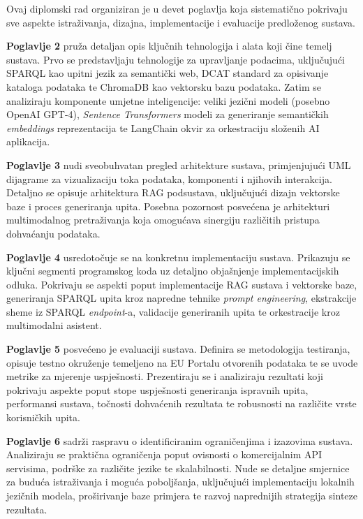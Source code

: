 Ovaj diplomski rad organiziran je u devet poglavlja koja sistematično pokrivaju sve aspekte istraživanja, dizajna, implementacije i evaluacije predloženog sustava.

\textbf{Poglavlje 2} pruža detaljan opis ključnih tehnologija i alata koji čine temelj sustava. Prvo se predstavljaju tehnologije za upravljanje podacima, uključujući SPARQL kao upitni jezik za semantički web, DCAT standard za opisivanje kataloga podataka te ChromaDB kao vektorsku bazu podataka. Zatim se analiziraju komponente umjetne inteligencije: veliki jezični modeli (posebno OpenAI GPT-4), \textit{Sentence Transformers} modeli za generiranje semantičkih \textit{embeddings} reprezentacija te LangChain okvir za orkestraciju složenih AI aplikacija.

\textbf{Poglavlje 3} nudi sveobuhvatan pregled arhitekture sustava, primjenjujući UML dijagrame za vizualizaciju toka podataka, komponenti i njihovih interakcija. Detaljno se opisuje arhitektura RAG podsustava, uključujući dizajn vektorske baze i proces generiranja upita. Posebna pozornost posvećena je arhitekturi multimodalnog pretraživanja koja omogućava sinergiju različitih pristupa dohvaćanju podataka.

\textbf{Poglavlje 4} usredotočuje se na konkretnu implementaciju sustava. Prikazuju se ključni segmenti programskog koda uz detaljno objašnjenje implementacijskih odluka. Pokrivaju se aspekti poput implementacije RAG sustava i vektorske baze, generiranja SPARQL upita kroz napredne tehnike \textit{prompt engineering}, ekstrakcije sheme iz SPARQL \textit{endpoint}-a, validacije generiranih upita te orkestracije kroz multimodalni asistent.

\textbf{Poglavlje 5} posvećeno je evaluaciji sustava. Definira se metodologija testiranja, opisuje testno okruženje temeljeno na EU Portalu otvorenih podataka te se uvode metrike za mjerenje uspješnosti. Prezentiraju se i analiziraju rezultati koji pokrivaju aspekte poput stope uspješnosti generiranja ispravnih upita, performansi sustava, točnosti dohvaćenih rezultata te robusnosti na različite vrste korisničkih upita.

\textbf{Poglavlje 6} sadrži raspravu o identificiranim ograničenjima i izazovima sustava. Analiziraju se praktična ograničenja poput ovisnosti o komercijalnim API servisima, podrške za različite jezike te skalabilnosti. Nude se detaljne smjernice za buduća istraživanja i moguća poboljšanja, uključujući implementaciju lokalnih jezičnih modela, proširivanje baze primjera te razvoj naprednijih strategija sinteze rezultata.

